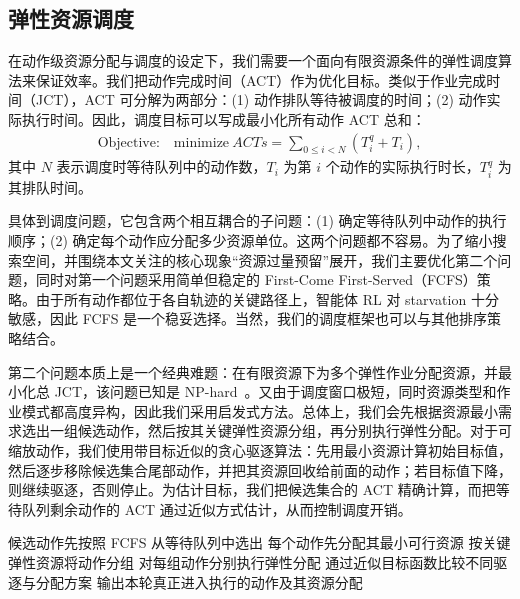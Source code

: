 \subsection{弹性资源调度}
\label{sec:design_scheduling}

在动作级资源分配与调度的设定下，我们需要一个面向有限资源条件的弹性调度算法来保证效率。我们把动作完成时间（ACT）作为优化目标。类似于作业完成时间（JCT），ACT 可分解为两部分：(1) 动作排队等待被调度的时间；(2) 动作实际执行时间。因此，调度目标可以写成最小化所有动作 ACT 总和：
\begin{equation}
\label{equ:obj}
\begin{aligned}
 \text{Objective:} \quad {\text{minimize}} ~ ACTs =\sum_{0\leq i < N} (T^q_{i} + T_i),
\end{aligned}
\end{equation}
其中 $N$ 表示调度时等待队列中的动作数，$T_i$ 为第 $i$ 个动作的实际执行时长，$T^q_i$ 为其排队时间。

具体到调度问题，它包含两个相互耦合的子问题：(1) 确定等待队列中动作的执行顺序；(2) 确定每个动作应分配多少资源单位。这两个问题都不容易。为了缩小搜索空间，并围绕本文关注的核心现象“资源过量预留”展开，我们主要优化第二个问题，同时对第一个问题采用简单但稳定的 First-Come First-Served（FCFS）策略。由于所有动作都位于各自轨迹的关键路径上，智能体 RL 对 starvation 十分敏感，因此 FCFS 是一个稳妥选择。当然，我们的调度框架也可以与其他排序策略结合。

第二个问题本质上是一个经典难题：在有限资源下为多个弹性作业分配资源，并最小化总 JCT，该问题已知是 NP-hard~\citep{bruno1974scheduling}。又由于调度窗口极短，同时资源类型和作业模式都高度异构，因此我们采用启发式方法。总体上，我们会先根据资源最小需求选出一组候选动作，然后按其关键弹性资源分组，再分别执行弹性分配。对于可缩放动作，我们使用带目标近似的贪心驱逐算法：先用最小资源计算初始目标值，然后逐步移除候选集合尾部动作，并把其资源回收给前面的动作；若目标值下降，则继续驱逐，否则停止。为估计目标，我们把候选集合的 ACT 精确计算，而把等待队列剩余动作的 ACT 通过近似方式估计，从而控制调度开销。

\begin{algorithm}[t]
\caption{弹性资源调度算法。}\label{alg:ersa}
\begin{footnotesize}
\begin{algorithmic}[1]
\State 候选动作先按照 FCFS 从等待队列中选出
\State 每个动作先分配其最小可行资源
\State 按关键弹性资源将动作分组
\State 对每组动作分别执行弹性分配
\State 通过近似目标函数比较不同驱逐与分配方案
\State 输出本轮真正进入执行的动作及其资源分配
\end{algorithmic}
\end{footnotesize}
\end{algorithm}

